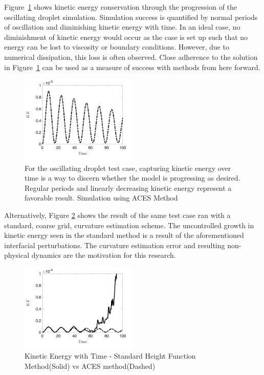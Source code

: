 Figure~\ref{fig:acesKE} shows kinetic energy conservation through the progression of the oscillating droplet simulation. Simulation success is quantified by normal periods of oscillation and diminishing kinetic energy with time. In an ideal case, no diminishment of kinetic energy would occur as the case is set up such that no energy can be lost to viscosity or boundary conditions. However, due to numerical dissipation, this loss is often observed. Close adherence to the solution in Figure~\ref{fig:acesKE} can be used as a measure of success with methods from here forward.
\begin{figure}[htpb]
	\centering
	\includegraphics[width=0.5\textwidth]{figs/ACES_KEplot.png}
	\caption{For the oscillating droplet test case, capturing kinetic energy over time is a way to discern whether the model is progressing as desired. Regular periods and linearly decreasing kinetic energy represent a favorable result. Simulation using ACES Method~\cite{Owkes2018}}
	\label{fig:acesKE}
\end{figure}
Alternatively, Figure \ref{fig:stdKE} shows the result of the same test case ran with a standard, coarse grid, curvature estimation scheme. The uncontrolled growth in kinetic energy seen in the standard method is a result of the aforementioned interfacial perturbations. The curvature estimation error and resulting non-physical dynamics are the motivation for this research. 
\begin{figure}[htpb]
	\centering
	\includegraphics[width=0.5\textwidth]{figs/stdHt_KEplot.png}
	\caption{Kinetic Energy with Time - Standard Height Function Method(Solid) vs ACES method(Dashed)}
	\label{fig:stdKE}
\end{figure}
 
